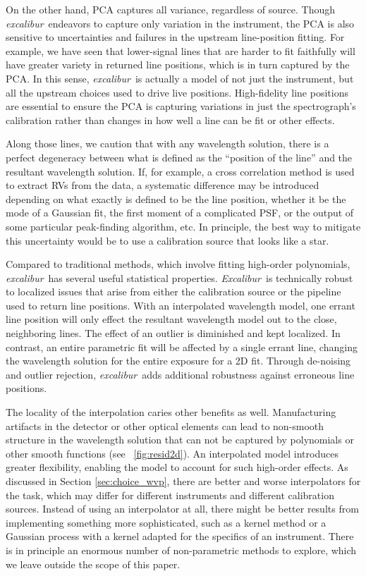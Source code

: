 \documentclass[twocolumn,table,xcolor,trackchanges]{aastex63}
\newcommand{\project}[1]{\textsl{#1}}
\newcommand{\name}{\project{excalibur}}
\newcommand{\Name}{\project{Excalibur}}
\begin{document}
On the other hand, PCA captures all variance, regardless of source.  Though \name\ endeavors to capture only variation in the instrument, the PCA is also sensitive to uncertainties and failures in the upstream line-position fitting.  For example, we have seen that lower-signal lines that are harder to fit faithfully will have greater variety in returned line positions, which is in turn captured by the PCA.  In this sense, \name\ is actually a model of not just the instrument, but all the upstream choices used to drive live positions.  High-fidelity line positions are essential to ensure the PCA is capturing variations in just the spectrograph's calibration rather than changes in how well a line can be fit or other effects.

Along those lines, we caution that with any wavelength solution, there is a perfect degeneracy between what is defined as the ``position of the line'' and the resultant wavelength solution.  If, for example, a cross correlation method is used to extract RVs from the data, a systematic difference may be introduced depending on what exactly is defined to be the line position, whether it be the mode of a Gaussian fit, the first moment of a complicated PSF, or the output of some particular peak-finding algorithm, etc.  In principle, the best way to mitigate this uncertainty would be to use a calibration source that looks like a star.

Compared to traditional methods, which involve fitting high-order polynomials, \name\ has several useful statistical properties.  \Name\ is technically robust to localized issues that arise from either the calibration source or the pipeline used to return line positions.  With an interpolated wavelength model, one errant line position will only effect the resultant wavelength model out to the close, neighboring lines.  The effect of an outlier is diminished and kept localized.  In contrast, an entire parametric fit will be affected by a single errant line, changing the wavelength solution for the entire exposure for a 2D fit.  Through de-noising and outlier rejection, \name\ adds additional robustness against erroneous line positions.

The locality of the interpolation caries other benefits as well.  Manufacturing artifacts in the detector or other optical elements can lead to non-smooth structure in the wavelength solution that can not be captured by polynomials or other smooth functions (see \figurename~\ref{fig:resid2d}).  An interpolated model introduces greater flexibility, enabling the model to account for such high-order effects.  As discussed in Section \ref{sec:choice_wvp}, there are better and worse interpolators for the task, which may differ for different instruments and different calibration sources.  Instead of using an interpolator at all, there might be better results from implementing something more sophisticated, such as a kernel method or a Gaussian process with a kernel adapted for the specifics of an instrument.  There is in principle an enormous number of non-parametric methods to explore, which we leave outside the scope of this paper.
\end{document}
